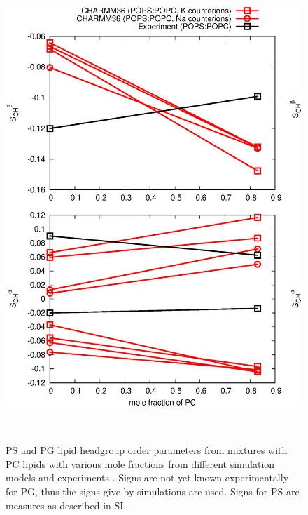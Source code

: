 \documentclass[aps,prl,superscriptaddress,twocolumn]{revtex4}
\begin{document}
\begin{figure}[]
  \centering
  \includegraphics[width=16.0cm]{../Figs/HGorderparametersPSPGvsPC.eps}
  \caption{\label{HGorderparametersPSPGvsPC}
    PS and PG lipid headgroup order parameters from mixtures with PC
    lipids with various mole fractions from different simulation models and experiments \cite{borle85,roux90}.
    Signs are not yet known experimentally for PG, thus the signs give by simulations are used.
    Signs for PS are measures as described in SI.
  }
   \\
\end{figure}
\end{document}
